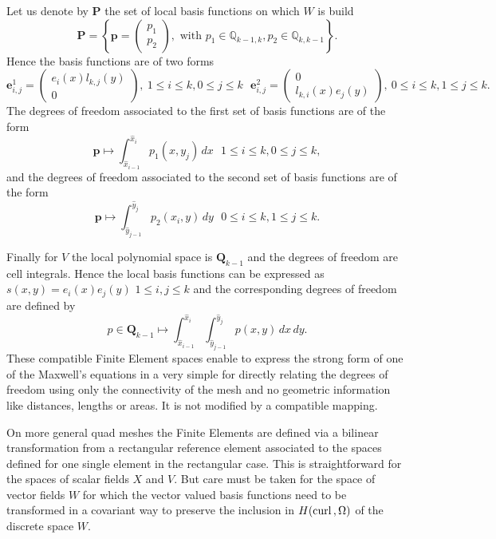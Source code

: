   Let us denote by $\mathbf{P}$ the set of local basis functions on which $W$ is build
$$ \mathbf{P}= \left\{ \mathbf{p}= \begin{pmatrix} p_1 \\ p_2 \end{pmatrix}, 
\mbox{ with } p_1\in \mathbb{Q}_{k-1,k}, p_2\in \mathbb{Q}_{k,k-1} \right\}.$$
Hence the basis functions are of two forms
$$ \mathbf{e}^1_{i,j}=  \begin{pmatrix} e_i(x) l_{k,j}(y) \\ 0
\end{pmatrix},  ~ 1\leq i\leq k, 0\leq j\leq k ~~~
\mathbf{e}^2_{i,j}=  \begin{pmatrix} 0\\ l_{k,i}(x) e_j(y) 
\end{pmatrix}, ~0\leq i\leq k, 1\leq j\leq k 
 .$$
The degrees of freedom associated to the first set of basis functions are of the form
$$ \mathbf{p} \mapsto \int_{\hat{x}_{i-1}}^{\hat{x}_{i}}  p_1(x,y_j) \,dx ~~~ 1\leq i\leq k, 0\leq j\leq k ,
$$
 and the degrees of freedom associated to the second set of basis functions are of the form
$$ \mathbf{p} \mapsto \int_{\hat{y}_{j-1}}^{\hat{y}_{j}}  p_2(x_i,y) \,dy  ~~~ 0\leq i\leq k, 1\leq j\leq k .
$$

Finally for $V$ the local polynomial space is $ \mathbf{Q}_{k-1}$ and the degrees of freedom are cell integrals. 
Hence the local basis functions can be expressed as
$s(x,y) = e_i(x)e_j(y)$ $1\leq i,j \leq k$ and the corresponding degrees of freedom are defined
by
$$ p\in \mathbf{Q}_{k-1} \mapsto   \int_{\hat{x}_{i-1}}^{\hat{x}_{i}}   \int_{\hat{y}_{j-1}}^{\hat{y}_{j}}  p(x,y) \,dx\,dy.  
$$
These compatible Finite Element spaces enable to express the strong form of one of the Maxwell's equations in a very simple for directly relating the degrees of freedom using only the connectivity of the mesh and no geometric information like distances, lengths or areas. It is not modified by a compatible mapping.

On more general quad meshes the Finite Elements are defined via a bilinear transformation from a rectangular reference element associated to the spaces defined for one single element in the rectangular case. This is straightforward for the  spaces of scalar fields $X$ and $V$. But care must be taken for the space of vector fields $W$ for which the vector valued basis functions need to be transformed in a covariant way to preserve the inclusion in $H(\mathrm{curl}\,,\Omega)$ of the discrete space $W$.

